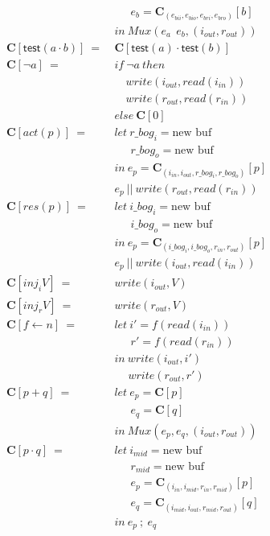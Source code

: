 \documentclass[12pt, letterpaper]{article}
\begin{document}
{\begin{align*}
        &\quad\ \ e_b = \mathbf{C}_{(e_{bii},e_{bio},e_{bri},e_{bro})}[b]\\
        &in\ Mux(e_a\ \ e_b, (i_{out},r_{out}))\\
      \mathbf{C}[\mathsf{test}(a \cdot b)]\ 
         =\ &\mathbf{C}[\mathsf{test}(a) \cdot \mathsf{test}(b)] \\
      \mathbf{C}[\neg a]\ 
         =\ 
         &if\ \neg a\ then\\
         &\quad write(i_{out}, read(i_{in}))\\
         &\quad write(r_{out}, read(r_{in}))\\
         &else\ \mathbf{C}[0]\\
      \mathbf{C}[act(p)]\ 
        =\ &
        let\ r\_bog_i = \text{new buf}\\
        &\quad\ \ r\_bog_o = \text{new buf}\\
        &in\ e_p = \mathbf{C}_{(i_{in}, i_{out}, r\_bog_i, r\_bog_o)}[p]\\
        &e_p\ ||\ write(r_{out}, read(r_{in}))
        \\
      \mathbf{C}[res(p)]\ 
        =\ &
        let\ i\_bog_i = \text{new buf}\\
        &\quad\ \ i\_bog_o = \text{new buf}\\
        &in\ e_p = \mathbf{C}_{(i\_bog_i, i\_bog_o, r_{in}, r_{out})}[p]\\
        &e_p\ ||\ write(i_{out}, read(i_{in}))
        \\
      \mathbf{C}[inj_iV]\ 
        =\ &
        write(i_{out}, V)
        \\
      \mathbf{C}[inj_rV]\ 
        =\ &
        write(r_{out}, V)
        \\
      \mathbf{C}[f \leftarrow n]\ 
        =\ &
        let\ i' = f(read(i_{in}))\\
        &\quad\ \ r' = f(read(r_{in}))\\
        &in\ write(i_{out}, i')\\
        &\quad \ write(r_{out}, r')
        \\
      \mathbf{C}[p + q]\ 
        =\ &
        let\ e_p = \mathbf{C}[p]\\
        &\quad\ \ e_q = \mathbf{C}[q]\\
        &in\ Mux(e_p, e_q, (i_{out},r_{out}))
        \\
      \mathbf{C}[p \cdot q]\ 
        =\ &
        let\ i_{mid} = \text{new buf}\\
        &\quad\ \ r_{mid} = \text{new buf}\\
        &\quad\ \ e_p = \mathbf{C}_{(i_{in}, i_{mid}, r_{in}, r_{mid})}[p]\\
        &\quad\ \ e_q = \mathbf{C}_{(i_{mid}, i_{out}, r_{mid}, r_{out})}[q]\\
        &in\ e_p\ ;\ e_q
    \end{align*}
    }
\end{document}
